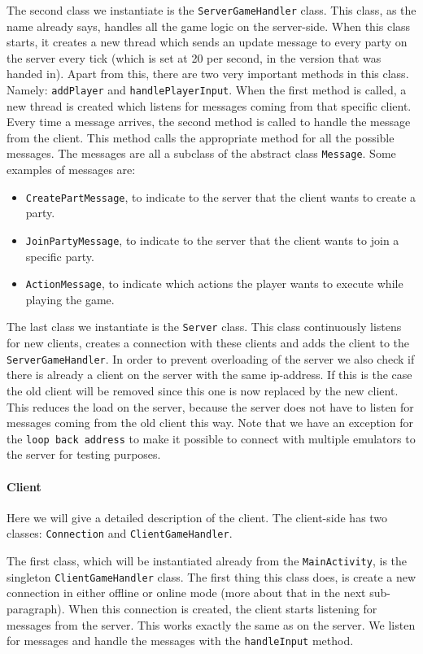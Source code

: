 \documentclass[../main.tex]{subfiles}
\begin{document}
        The second class we instantiate is the \texttt{ServerGameHandler} class. This class, as the name already says, handles all the game logic on the server-side. When this class starts, it creates a new thread which sends an update message to every party on the server every tick (which is set at 20 per second, in the version that was handed in). Apart from this, there are two very important methods in this class. Namely: \texttt{addPlayer} and \texttt{handlePlayerInput}. When the first method is called, a new thread is created which listens for messages coming from that specific client. Every time a message arrives, the second method is called to handle the message from the client. This method calls the appropriate method for all the possible messages. The messages are all a subclass of the abstract class \texttt{Message}. Some examples of messages are: 
		\begin{itemize}
			\item \texttt{CreatePartMessage}, to indicate to the server that the client wants to create a party.
			\item \texttt{JoinPartyMessage}, to indicate to the server that the client wants to join a specific party.
			\item \texttt{ActionMessage}, to indicate which actions the player wants to execute while playing the game.
		\end{itemize}
        The last class we instantiate is the \texttt{Server} class. This class continuously listens for new clients, creates a connection with these clients and adds the client to the \texttt{ServerGameHandler}. In order to prevent overloading of the server we also check if there is already a client on the server with the same ip-address. If this is the case the old client will be removed since this one is now replaced by the new client. This reduces the load on the server, because the server does not have to listen for messages coming from the old client this way. Note that we have an exception for the \texttt{loop back address} to make it possible to connect with multiple emulators to the server for testing purposes.

        \paragraph{Client}
        Here we will give a detailed description of the client. The client-side has two classes: \texttt{Connection} and \texttt{ClientGameHandler}.

        The first class, which will be instantiated already from the \texttt{MainActivity}, is the singleton \texttt{ClientGameHandler} class. The first thing this class does, is create a new connection in either offline or online mode (more about that in the next sub-paragraph). When this connection is created, the client starts listening for messages from the server. This works exactly the same as on the server. We listen for messages and handle the messages with the \texttt{handleInput} method. 
        
\end{document}
